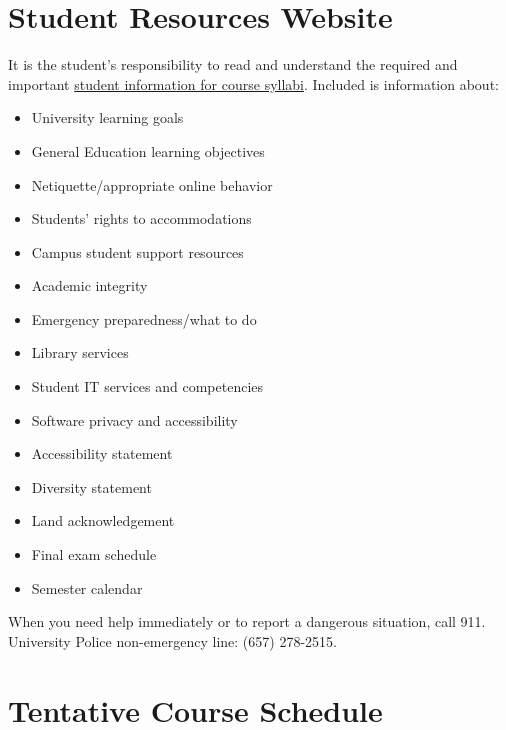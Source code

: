 \documentclass{syllabus}
\begin{document}
\section*{Student Resources Website}

\noindent It is the student's responsibility to read and understand the required and important \href{https://fdc.fullerton.edu/teaching/student-info-syllabi.html}{student information for course syllabi}. Included is information about:
{
\begin{itemize}[nosep]
\item University learning goals
\item General Education learning objectives
\item Netiquette/appropriate online behavior
\item Students' rights to accommodations
\item Campus student support resources
\item Academic integrity
\item Emergency preparedness/what to do
\item Library services
\item Student IT services and competencies
\item Software privacy and accessibility
\item Accessibility statement
\item Diversity statement
\item Land acknowledgement
\item Final exam schedule
\item Semester calendar
\end{itemize}
}

\vspace{0.5em}
\noindent When you need help immediately or to report a dangerous situation, call 911. University Police non-emergency line: (657) 278-2515.

\clearpage
\section*{\centering Tentative Course Schedule} \vspace{0.5em}
\end{document}
